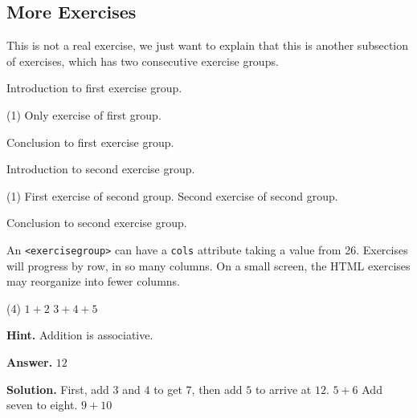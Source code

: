 \documentclass[10pt,]{article}
\theoremstyle{plain}
\theoremstyle{definition}
\theoremstyle{definition}
\theoremstyle{definition}
\theoremstyle{definition}
\theoremstyle{definition}
\theoremstyle{definition}
\numberwithin{equation}{section}
\begin{document}
\typeout{************************************************}
\typeout{************************************************}
\subsection[{More Exercises}]{More Exercises}\label{exercises-3}
\begin{exerciselist}
\item[1.]\hypertarget{exercise-9}{}\hypertarget{p-296}{}%
This is not a real exercise, we just want to explain that this is another subsection of exercises, which has two consecutive exercise groups.%
\par\smallskip
\end{exerciselist}
\hypertarget{exercisegroup-2}{}\par\noindent \hypertarget{p-297}{}%
Introduction to first exercise group.%
\begin{exercisegroup}(1)
\exercise[2.]\hypertarget{exercise-10}{}\hypertarget{p-298}{}%
Only exercise of first group.%
\end{exercisegroup}
\hypertarget{p-299}{}%
Conclusion to first exercise group.%
\par\smallskip\noindent
\hypertarget{exercisegroup-3}{}\par\noindent \hypertarget{p-300}{}%
Introduction to second exercise group.%
\begin{exercisegroup}(1)
\exercise[3.]\hypertarget{exercise-11}{}\hypertarget{p-301}{}%
First exercise of second group.%
\exercise[4.]\hypertarget{exercise-12}{}\hypertarget{p-302}{}%
Second exercise of second group.%
\end{exercisegroup}
\hypertarget{p-303}{}%
Conclusion to second exercise group.%
\par\smallskip\noindent
\hypertarget{exercisegroup-4}{}\par\noindent \hypertarget{p-304}{}%
An \lstinline?<exercisegroup>? can have a \lstinline?cols? attribute taking a value from 2\textendash{}6. Exercises will progress by row, in so many columns. On a small screen, the HTML exercises may reorganize into fewer columns.%
\begin{exercisegroup}(4)
\exercise[5.]\hypertarget{exercise-13}{}\hypertarget{p-305}{}%
\(1+2\)%
\exercise[6.]\hypertarget{exercise-14}{}\hypertarget{p-306}{}%
\(3+4+5\)%
\par\smallskip%
\noindent\textbf{Hint.}\hypertarget{hint-5}{}\quad%
\hypertarget{p-307}{}%
Addition is associative.%
\par\smallskip%
\noindent\textbf{Answer.}\hypertarget{answer-7}{}\quad%
\hypertarget{p-308}{}%
\(12\)%
\par\smallskip%
\noindent\textbf{Solution.}\hypertarget{solution-9}{}\quad%
\hypertarget{p-309}{}%
First, add \(3\) and \(4\) to get \(7\), then add \(5\) to arrive at \(12\).%
\exercise[7.]\hypertarget{exercise-15}{}\hypertarget{p-310}{}%
\(5+6\)%
\exercise[8.]\hypertarget{exercise-16}{}\hypertarget{p-311}{}%
Add seven to eight.%
\exercise[9.]\hypertarget{exercise-17}{}\hypertarget{p-312}{}%
\(9+10\)%
\end{exercisegroup}
\end{document}
